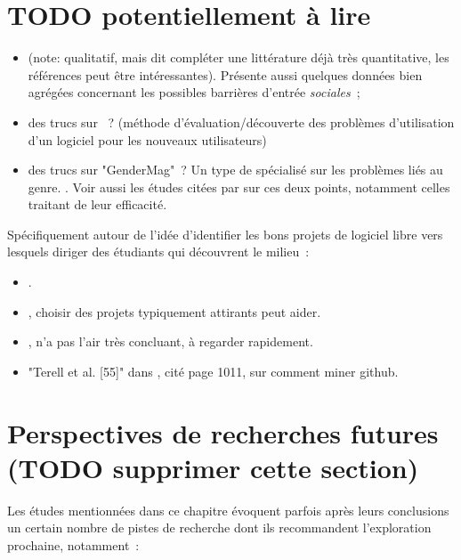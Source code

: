 \section*{TODO potentiellement à lire}

\begin{itemize}
    \item {} (note: qualitatif, mais dit compléter une littérature déjà très
        quantitative, les références peut être intéressantes). Présente aussi quelques données bien agrégées
        concernant les possibles barrières d'entrée \emph{sociales} ;
    \item des trucs sur  ? (méthode  d'évaluation/découverte des
        problèmes d'utilisation d'un logiciel pour les nouveaux utilisateurs)
    \item des trucs sur "GenderMag" ? Un type de  spécialisé sur les problèmes liés
        au genre. . Voir aussi les études citées par
        \textcite[p.~1005-1006]{barriers-2018} sur ces deux points, notamment celles traitant de leur
        efficacité.
\end{itemize}

Spécifiquement autour de l'idée d'identifier les bons projets de logiciel libre vers lesquels diriger des
étudiants qui découvrent le milieu :

\begin{itemize}
    \item {}.
    \item {}, choisir des projets typiquement attirants peut aider.
    \item {}, n'a pas l'air très concluant, à regarder rapidement.
    \item "Terell et al. [55]" dans \textcite{barriers-2018}, cité page 1011, sur comment miner github.
\end{itemize}

\section*{Perspectives de recherches futures (TODO supprimer cette section)}

Les études mentionnées dans ce chapitre évoquent parfois après leurs conclusions un certain nombre de pistes
de recherche dont ils recommandent l'exploration prochaine, notamment :

